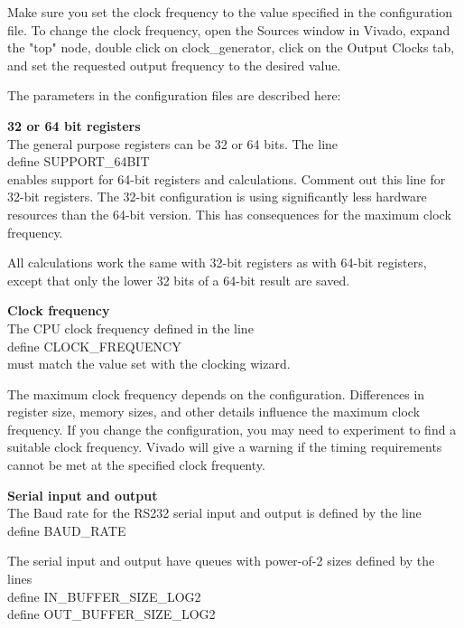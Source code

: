 \documentclass[11pt,a4paper,oneside,openright]{report}
\newcommand{\vv}{ \vspace{2mm} }   %
\begin{document}
Make sure you set the clock frequency to the value specified in the configuration file. To change the clock frequency, open the Sources window in Vivado, expand the "top" node, double click on clock\_generator, click on the Output Clocks tab, and set the requested output frequency to the desired value.
\vv

The parameters in the configuration files are described here:
\vv
\vv

\textbf{32 or 64 bit registers} \\
The general purpose registers can be 32 or 64 bits. The line\\
\hspace{10mm} \textasciigrave define SUPPORT\_64BIT \\
enables support for 64-bit registers and calculations. Comment out this line for 32-bit registers. The 32-bit configuration is using significantly less hardware resources than the 64-bit version. This has consequences for the maximum clock frequency.
\vv

All calculations work the same with 32-bit registers as with 64-bit registers, except that only the lower 32 bits of a 64-bit result are saved.
\vv
\vv

\textbf{Clock frequency} \\
The CPU clock frequency defined in the line \\
\hspace{10mm} \textasciigrave define CLOCK\_FREQUENCY \\
must match the value set with the clocking wizard.
\vv

The maximum clock frequency depends on the configuration. Differences in register size, memory sizes, and other details influence the maximum clock frequency.  
If you change the configuration, you may need to experiment to find a suitable clock frequency. Vivado will give a warning if the timing requirements cannot be met at the specified clock frequenty. 
\vv 
\vv


\textbf{Serial input and output} \\
The Baud rate for the RS232 serial input and output is defined by the line \\
\hspace{10mm} \textasciigrave define BAUD\_RATE \\
\vv

The serial input and output have queues with power-of-2 sizes defined by the lines \\
\hspace{10mm} \textasciigrave define IN\_BUFFER\_SIZE\_LOG2 \\
\hspace{10mm} \textasciigrave define OUT\_BUFFER\_SIZE\_LOG2 \\
\vv 
\vv
\end{document}
